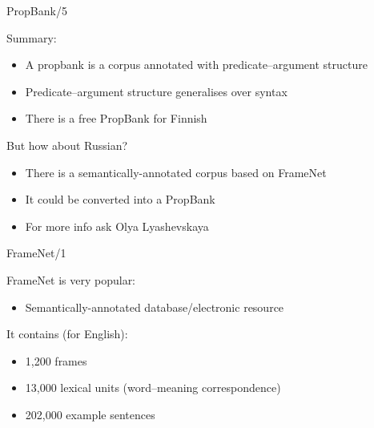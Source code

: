 \documentclass[10pt, compress]{beamer}
\begin{document}
\begin{frame}{PropBank/5}

Summary:

\begin{itemize}
  \item A propbank is a corpus annotated with predicate--argument structure
  \item Predicate--argument structure generalises over syntax
  \item There is a free PropBank for Finnish
\end{itemize}

But how about Russian?

\begin{itemize}
  \item There is a semantically-annotated corpus based on FrameNet
  \item It could be converted into a PropBank 
  \item For more info ask Olya Lyashevskaya
\end{itemize}

\end{frame}

\begin{frame}{FrameNet/1}

FrameNet is very popular:

\begin{itemize}
  \item Semantically-annotated database/electronic resource
\end{itemize}

It contains (for English):
\begin{itemize}
  \item 1,200 frames
  \item 13,000 lexical units (word--meaning correspondence)
  \item 202,000 example sentences
\end{itemize}


\end{frame}
\end{document}

